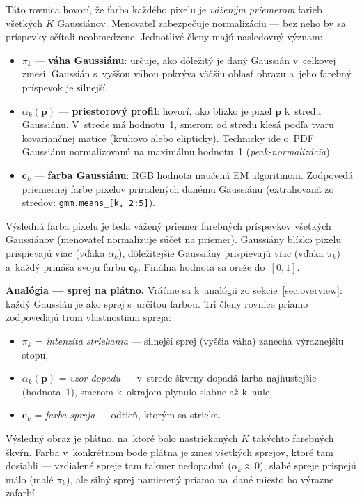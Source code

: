 \documentclass[a4paper,11pt]{article}
\begin{document}
\noindent
Táto rovnica hovorí, že farba každého pixelu je \emph{váženým priemerom}
farieb všetkých $K$ Gaussiánov.  Menovateľ zabezpečuje normalizáciu ---
bez neho by sa príspevky sčítali neobmedzene.
Jednotlivé členy majú nasledovný význam:

\begin{itemize}
  \item $\pi_k$ --- \textbf{váha Gaussiánu}: určuje, ako dôležitý je
        daný Gaussián v~celkovej zmesi.  Gaussián s~vyššou váhou
        pokrýva väčšiu oblasť obrazu a~jeho farebný príspevok je
        silnejší.

  \item $\alpha_k(\mathbf{p})$ --- \textbf{priestorový profil}:
        hovorí, ako blízko je pixel $\mathbf{p}$ k~stredu Gaussiánu.
        V~strede má hodnotu~1, smerom od stredu klesá podľa tvaru
        kovariančnej matice (kruhovo alebo elipticky).
        Technicky ide o~PDF Gaussiánu normalizovanú na maximálnu
        hodnotu~1 (\emph{peak-normalizácia}).

  \item $\mathbf{c}_k$ --- \textbf{farba Gaussiánu}: RGB hodnota
        naučená EM algoritmom.  Zodpovedá priemernej farbe pixelov
        priradených danému Gaussiánu (extrahovaná zo stredov:
        \texttt{gmm.means\_[k, 2:5]}).
\end{itemize}

\noindent
Výsledná farba pixelu je teda vážený priemer farebných príspevkov
všetkých Gaussiánov (menovateľ normalizuje súčet na priemer).
Gaussiány blízko pixelu prispievajú viac
(vďaka $\alpha_k$), dôležitejšie Gaussiány prispievajú viac
(vďaka $\pi_k$) a~každý prináša svoju farbu $\mathbf{c}_k$.
Finálna hodnota sa oreže do~$[0, 1]$.

\medskip
\textbf{Analógia --- sprej na plátno.}
Vráťme sa k~analógii zo sekcie~\ref{sec:overview}: každý Gaussián je
ako sprej s~určitou farbou.  Tri členy rovnice priamo zodpovedajú
trom vlastnostiam spreja:
\begin{itemize}[nosep]
  \item $\pi_k$ = \emph{intenzita striekania} --- silnejší sprej
        (vyššia váha) zanechá výraznejšiu stopu,
  \item $\alpha_k(\mathbf{p})$ = \emph{vzor dopadu} --- v~strede škvrny
        dopadá farba najhustejšie (hodnota~1), smerom k~okrajom
        plynulo slabne až k~nule,
  \item $\mathbf{c}_k$ = \emph{farba spreja} --- odtieň, ktorým sa strieka.
\end{itemize}
Výsledný obraz je plátno, na~ktoré bolo nastriekaných $K$ takýchto
farebných škvŕn.  Farba v~konkrétnom bode plátna je zmes všetkých
sprejov, ktoré tam dosiahli --- vzdialené spreje tam takmer nedopadnú
($\alpha_k \approx 0$), slabé spreje prispejú málo (malé $\pi_k$),
ale silný sprej namierený priamo na~dané miesto ho výrazne zafarbí.
\end{document}
